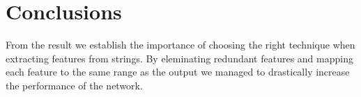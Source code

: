 
\section{Conclusions}

From the result we establish the importance of choosing the right technique
when extracting features from strings. By eleminating redundant features and
mapping each feature to the same range as the output we managed to drastically
increase the performance of the network.
